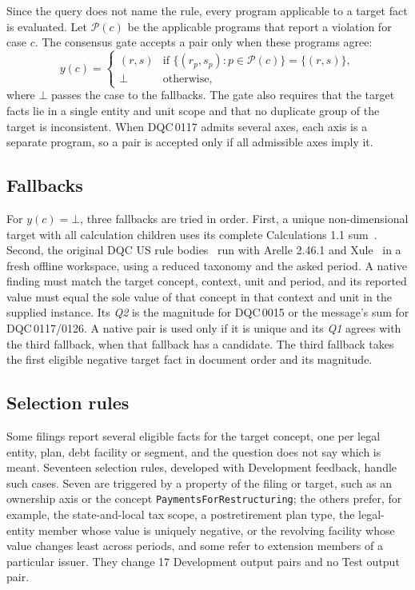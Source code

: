 \documentclass[conference]{IEEEtran}
\newcommand{\DQC}[1]{DQC\,#1}
\newcommand{\QA}{\textit{Q1}}
\newcommand{\QB}{\textit{Q2}}
\newcommand{\Pset}{\mathcal{P}}
\begin{document}
Since the query does not name the rule, every program applicable to a target fact is evaluated. Let $\Pset(c)$ be the applicable programs that report a violation for case $c$. The consensus gate accepts a pair only when these programs agree:
\begin{equation}
y(c)=
\begin{cases}
(r,s) & \text{if } \{(r_p,s_p):p\in\Pset(c)\}=\{(r,s)\},\\
\bot & \text{otherwise,}
\end{cases}
\label{eq:gate}
\end{equation}
where $\bot$ passes the case to the fallbacks. The gate also requires that the target facts lie in a single entity and unit scope and that no duplicate group of the target is inconsistent. When \DQC{0117} admits several axes, each axis is a separate program, so a pair is accepted only if all admissible axes imply it.

\subsection{Fallbacks}
For $y(c)=\bot$, three fallbacks are tried in order. First, a unique non-dimensional target with all calculation children uses its complete Calculations 1.1 sum~\cite{xbrlcalc11}. Second, the original DQC US rule bodies~\cite{dqcrules} run with Arelle 2.46.1 and Xule~\cite{arelle} in a fresh offline workspace, using a reduced taxonomy and the asked period. A native finding must match the target concept, context, unit and period, and its reported value must equal the sole value of that concept in that context and unit in the supplied instance. Its \QB{} is the magnitude for \DQC{0015} or the message's sum for \DQC{0117/0126}. A native pair is used only if it is unique and its \QA{} agrees with the third fallback, when that fallback has a candidate. The third fallback takes the first eligible negative target fact in document order and its magnitude.

\subsection{Selection rules}
\label{sec:selection}
Some filings report several eligible facts for the target concept, one per legal entity, plan, debt facility or segment, and the question does not say which is meant. Seventeen selection rules, developed with Development feedback, handle such cases. Seven are triggered by a property of the filing or target, such as an ownership axis or the concept \texttt{PaymentsForRestructuring}; the others prefer, for example, the state-and-local tax scope, a postretirement plan type, the legal-entity member whose value is uniquely negative, or the revolving facility whose value changes least across periods, and some refer to extension members of a particular issuer. They change 17 Development output pairs and no Test output pair.
\end{document}
